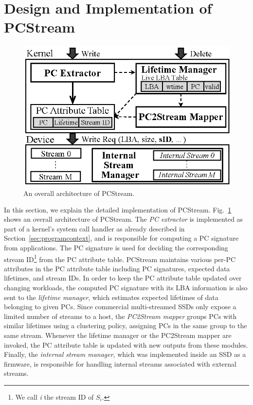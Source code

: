 \section{Design and Implementation of \textsf{PCStream}}

\begin{figure}[t]
	\centering
	\includegraphics[width=0.8\linewidth]{figure/overview_1}
	\vspace{-9pt}
	\caption{An overall architecture of \textsf{\small PCStream}.}
	\label{fig:architecture}
	\vspace{-10pt}
\end{figure}


In this section, we explain the detailed implementation of \textsf{\small
PCStream}.  Fig.~\ref{fig:architecture} shows an overall architecture of
\textsf{\small PCStream}. The \textit{PC extractor} is implemented as part of a
kernel's system call handler as already described in
Section~\ref{sec:programcontext}, and is responsible for computing a PC
signature from applications.  The PC signature is used for deciding the
corresponding stream ID\footnote{ We call {\it i} the stream ID of $S_i$.} from
the PC attribute table.  \textsf{\small PCStream} maintains various per-PC
attributes in the PC attribute table including PC signatures, expected data
lifetimes, and stream IDs.  In order to keep the PC attribute table updated
over changing workloads, the computed PC signature with its LBA information is
also sent to the {\it lifetime manager}, which estimates expected lifetimes of
data belonging to given PCs.  Since commercial multi-streamed SSDs only expose
a limited number of streams to a host, the \textit{PC2Stream mapper} groups PCs
with similar lifetimes using a clustering policy, assigning PCs in the same
group to the same stream.  Whenever the lifetime manager or the PC2Stream
mapper are invoked, the PC attribute table is updated with new outputs from
these modules.  Finally, the \textit{internal stream manager}, 
which was implemented inside an SSD as a firmware, is responsible for
handling internal streams associated with external streams.

